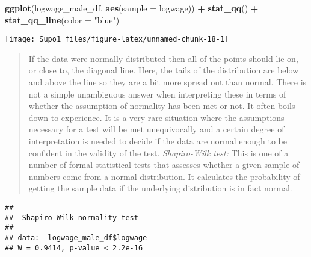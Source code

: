 \documentclass[
]{article}
\newenvironment{Shaded}{\begin{snugshade}}{\end{snugshade}}
\newcommand{\AttributeTok}[1]{\textcolor[rgb]{0.13,0.29,0.53}{#1}}
\newcommand{\FunctionTok}[1]{\textcolor[rgb]{0.13,0.29,0.53}{\textbf{#1}}}
\newcommand{\NormalTok}[1]{#1}
\newcommand{\SpecialCharTok}[1]{\textcolor[rgb]{0.81,0.36,0.00}{\textbf{#1}}}
\newcommand{\StringTok}[1]{\textcolor[rgb]{0.31,0.60,0.02}{#1}}
\begin{document}
\begin{Shaded}
\begin{Highlighting}[]
\FunctionTok{ggplot}\NormalTok{(logwage\_male\_df,}
       \FunctionTok{aes}\NormalTok{(}\AttributeTok{sample =}\NormalTok{ logwage)) }\SpecialCharTok{+}
  \FunctionTok{stat\_qq}\NormalTok{() }\SpecialCharTok{+}
  \FunctionTok{stat\_qq\_line}\NormalTok{(}\AttributeTok{color =} \StringTok{"blue"}\NormalTok{)}
\end{Highlighting}
\end{Shaded}

\begin{center}\texttt{[image: Supo1\_files/figure-latex/unnamed-chunk-18-1]} \end{center}

\begin{quote}
If the data were normally distributed then all of the points should lie
on, or close to, the diagonal line. Here, the tails of the distribution
are below and above the line so they are a bit more spread out than
normal. There is not a simple unambiguous answer when interpreting these
in terms of whether the assumption of normality has been met or not. It
often boils down to experience. It is a very rare situation where the
assumptions necessary for a test will be met unequivocally and a certain
degree of interpretation is needed to decide if the data are normal
enough to be confident in the validity of the test. \emph{Shapiro-Wilk
test:} This is one of a number of formal statistical tests that assesses
whether a given sample of numbers come from a normal distribution. It
calculates the probability of getting the sample data if the underlying
distribution is in fact normal.
\end{quote}

\begin{Shaded}
\end{Shaded}

\begin{verbatim}
## 
##  Shapiro-Wilk normality test
## 
## data:  logwage_male_df$logwage
## W = 0.9414, p-value < 2.2e-16
\end{verbatim}
\end{document}
